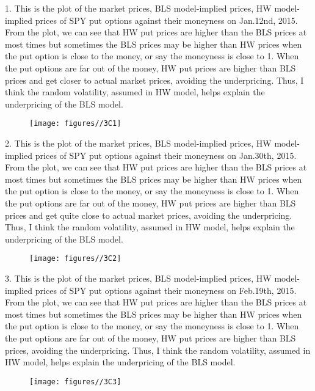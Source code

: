 \documentclass{report}
\begin{document}
1. This is the plot of the market prices, BLS model-implied prices, HW model-implied prices of SPY put options against their moneyness on Jan.12nd, 2015. From the plot, we can see that HW put prices are higher than the BLS prices at most times but sometimes the BLS prices may be higher than HW prices when the put option is close to the money, or say the moneyness is close to 1. When the put options are far out of the money, HW put prices are higher than BLS prices and get closer to actual market prices, avoiding the underpricing. Thus, I think the random volatility, assumed in HW model, helps explain the underpricing of the BLS model.
\begin{figure}[H]
        \centering 
         \texttt{[image: figures//3C1]}
\end{figure}

2. This is the plot of the market prices, BLS model-implied prices, HW model-implied prices of SPY put options against their moneyness on Jan.30th, 2015. From the plot, we can see that HW put prices are higher than the BLS prices at most times but sometimes the BLS prices may be higher than HW prices when the put option is close to the money, or say the moneyness is close to 1. When the put options are far out of the money, HW put prices are higher than BLS prices and get quite close to actual market prices, avoiding the underpricing. Thus, I think the random volatility, assumed in HW model, helps explain the underpricing of the BLS model.
\begin{figure}[H]
        \centering 
         \texttt{[image: figures//3C2]}
\end{figure}

3. This is the plot of the market prices, BLS model-implied prices, HW model-implied prices of SPY put options against their moneyness on Feb.19th, 2015. From the plot, we can see that HW put prices are higher than the BLS prices at most times but sometimes the BLS prices may be higher than HW prices when the put option is close to the money, or say the moneyness is close to 1. When the put options are far out of the money, HW put prices are higher than BLS prices, avoiding the underpricing. Thus, I think the random volatility, assumed in HW model, helps explain the underpricing of the BLS model.
\begin{figure}[H]
        \centering 
         \texttt{[image: figures//3C3]}
\end{figure}
\end{document}
